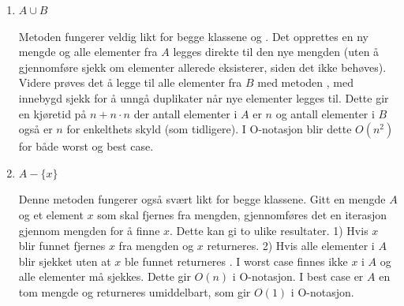 \documentclass[10pt,a4paper,norsk]{article}
\begin{document}
\begin{enumerate}[leftmargin=*,itemsep=1cm,labelsep=1.5em,label=\roman*.]
        \par Metoden fungerer veldig likt for begge klassene og for to gitte mengder $A$ og $B$ gjennomføres det en binær operasjon som returnerer  hvis $A = B$ og  hvis $A \neq B$. Metoden gjennomfører først sjekk for å forsikre at $A$ og $B$ har likt antall elementer. Videre brukes den tidligere definerte metoden  for å sjekke om alle elementer i $A$ også finnes i $B$. Dette gir samme O-notasjon for  som for  med best case $O(1)$ i tilfeller der $A$ og $B$ har ulikt antall elementer. Og worst case $O(n^2)$ i tilfeller der $A = B$.
    \item
        \par $A \cup B$
        \par Metoden fungerer veldig likt for begge klassene  og . Det opprettes en ny mengde og alle elementer fra $A$ legges direkte til den nye mengden (uten å gjennomføre sjekk om elementer allerede eksisterer, siden det ikke behøves). Videre prøves det å legge til alle elementer fra $B$ med metoden , med innebygd sjekk  for å unngå duplikater når nye elementer legges til. Dette gir en kjøretid på $n + n \cdot n$ der antall elementer i $A$ er $n$ og antall elementer i $B$ også er $n$ for enkelthets skyld (som tidligere). I O-notasjon blir dette $O(n^2)$ for både worst og best case.
    \item
        \par $A - \{x\}$
        \par Denne metoden fungerer også svært likt for begge klassene. Gitt en mengde $A$ og et element $x$ som skal fjernes fra mengden, gjennomføres det en iterasjon gjennom mengden for å finne $x$. Dette kan gi to ulike resultater. 1) Hvis $x$ blir funnet fjernes $x$ fra mengden og $x$ returneres. 2) Hvis alle elementer i $A$ blir sjekket uten at $x$ ble funnet returneres . I worst case finnes ikke $x$ i $A$ og alle elementer må sjekkes. Dette gir $O(n)$ i O-notasjon. I best case er $A$ en tom mengde og  returneres umiddelbart, som gir $O(1)$ i O-notasjon.
\end{enumerate}
\end{document}
